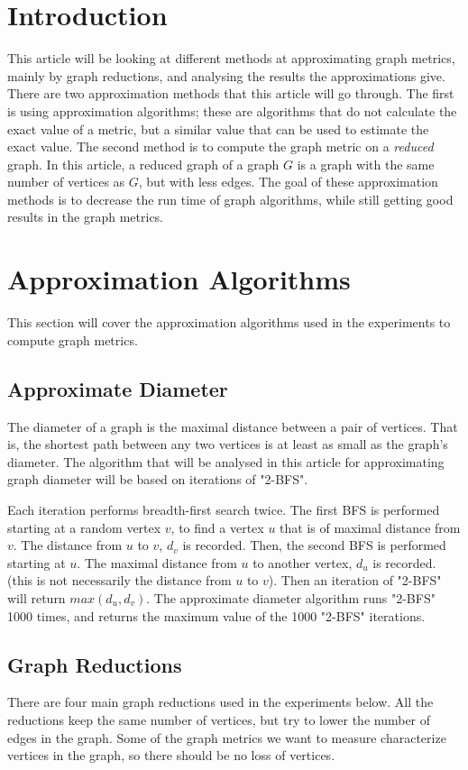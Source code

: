 \documentclass[11pt]{article}
\begin{document}
\section{Introduction}
This article will be looking at different methods at approximating graph metrics, mainly by graph reductions, and analysing the results the approximations give.  There are two approximation methods that this article will go through.  The first is using approximation algorithms; these are algorithms that do not calculate the exact value of a metric, but a similar value that can be used to estimate the exact value.  The second method is to compute the graph metric on a \textit{reduced} graph. In this article, a reduced graph of a graph $G$ is a graph with the same number of vertices as $G$, but with less edges.  The goal of these approximation methods is to decrease the run time of graph algorithms, while still getting good results in the graph metrics.

\section{Approximation Algorithms}
This section will cover the approximation algorithms used in the experiments to compute graph metrics.
\subsection{Approximate Diameter} 
The diameter of a graph is the maximal distance between a pair of vertices.  That is, the shortest path between any two vertices is at least as small as the graph's diameter.  The algorithm that will be analysed in this article for approximating graph diameter will be based on iterations of "2-BFS".  

Each iteration performs breadth-first search twice.  The first BFS is performed starting at a random vertex $v$, to find a vertex $u$ that is of maximal distance from $v$.  The distance from $u$ to $v$, $d_v$ is recorded.  Then, the second BFS is performed starting at $u$.  The maximal distance from $u$ to another vertex, $d_u$ is recorded. (this is not necessarily the distance from $u$ to $v$).  Then an iteration of "2-BFS" will return $max(d_u, d_v)$.  The approximate diameter algorithm runs "2-BFS" 1000 times, and returns the maximum value of the 1000 "2-BFS" iterations.

\subsection{Graph Reductions}
There are four main graph reductions used in the experiments below.  All the reductions keep the same number of vertices, but try to lower the number of edges in the graph.  Some of the graph metrics we want to measure characterize vertices in the graph, so there should be no loss of vertices.  
\end{document}
